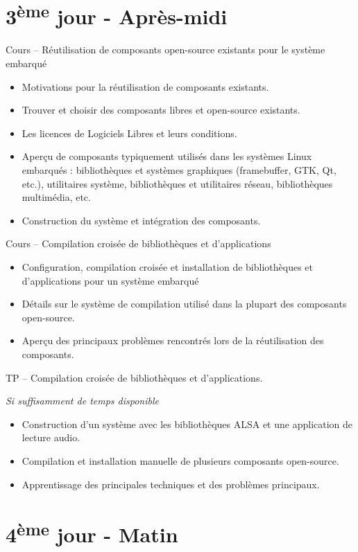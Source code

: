 \documentclass[a4paper,12pt,obeyspaces,spaces,hyphens]{article}
\begin{document}
\section{3\textsuperscript{ème} jour - Après-midi}

\feagendaonecolumn
{Cours – Réutilisation de composants open-source existants pour le système
embarqué}
{
  \begin{itemize}
  \item Motivations pour la réutilisation de composants existants.
  \item Trouver et choisir des composants libres et open-source existants.
  \item Les licences de Logiciels Libres et leurs conditions.
  \item Aperçu de composants typiquement utilisés dans les systèmes
	Linux embarqués : bibliothèques et systèmes graphiques (framebuffer,
	GTK, Qt, etc.), utilitaires système, bibliothèques et
	utilitaires réseau, bibliothèques multimédia, etc.
  \item Construction du système et intégration des composants.
  \end{itemize}
}

\feagendatwocolumn
{Cours – Compilation croisée de bibliothèques et d'applications}
{
  \begin{itemize}
  \item Configuration, compilation croisée et installation de bibliothèques
	et d'applications pour un système embarqué
  \item Détails sur le système de compilation utilisé dans la plupart
	des composants open-source.
  \item Aperçu des principaux problèmes rencontrés lors de la
	réutilisation des composants.
  \end{itemize}
}
{TP – Compilation croisée de bibliothèques et d'applications.}
{
  {\em Si suffisamment de temps disponible}
  \begin{itemize}
  \item Construction d'un système avec les bibliothèques ALSA et une
	application de lecture audio.
  \item Compilation et installation manuelle de plusieurs
	composants open-source.
  \item Apprentissage des principales techniques et des problèmes principaux.
  \end{itemize}
}

\section{4\textsuperscript{ème} jour - Matin}
\end{document}
